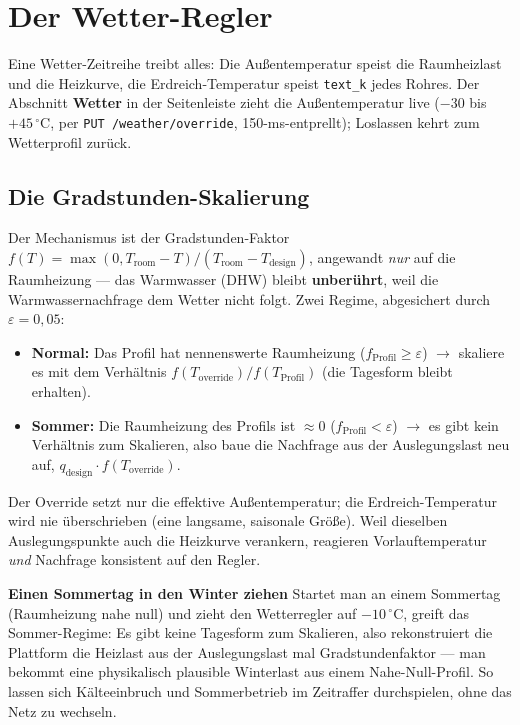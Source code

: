 \documentclass[11pt,a4paper,parskip=half]{scrreprt}
\newcommand{\ui}[1]{\textsf{\bfseries #1}}
\newcommand{\api}[1]{\texttt{#1}}
\newcommand{\gC}{\,\ensuremath{{}^{\circ}\mathrm{C}}}
\newenvironment{beispiel}[1][Beispiel]
  {\par\medskip{\color{bsp}\hrule height 0.8pt}\nopagebreak\smallskip
   \noindent\textbf{\textsf{\textcolor{bsp}{#1}}}\quad\ignorespaces}
  {\par\nopagebreak\smallskip{\color{bsp}\hrule height 0.8pt}\par\medskip}
\begin{document}
\chapter{Der Wetter-Regler}
\label{ch:wetter}

Eine Wetter-Zeitreihe treibt alles: Die Außentemperatur speist die
Raumheizlast und die Heizkurve, die Erdreich-Temperatur speist \texttt{text\_k}
jedes Rohres. Der Abschnitt \ui{Wetter} in der Seitenleiste zieht die
Außentemperatur live ($-30$ bis $+45\gC$, per \api{PUT /weather/override},
150-ms-entprellt); Loslassen kehrt zum Wetterprofil zurück.

\section{Die Gradstunden-Skalierung}

Der Mechanismus ist der Gradstunden-Faktor
$f(T)=\max(0,T_\text{room}-T)/(T_\text{room}-T_\text{design})$, angewandt
\emph{nur} auf die Raumheizung --- das Warmwasser (DHW) bleibt \textbf{unberührt},
weil die Warmwassernachfrage dem Wetter nicht folgt. Zwei Regime, abgesichert
durch $\varepsilon=0{,}05$:

\begin{itemize}[nosep]
  \item \textbf{Normal:} Das Profil hat nennenswerte Raumheizung
    ($f_\text{Profil}\geq\varepsilon$) $\rightarrow$ skaliere es mit dem
    Verhältnis $f(T_\text{override})/f(T_\text{Profil})$ (die Tagesform bleibt
    erhalten).
  \item \textbf{Sommer:} Die Raumheizung des Profils ist $\approx$0
    ($f_\text{Profil}<\varepsilon$) $\rightarrow$ es gibt kein Verhältnis zum
    Skalieren, also baue die Nachfrage aus der Auslegungslast neu auf,
    $q_\text{design}\cdot f(T_\text{override})$.
\end{itemize}

Der Override setzt nur die effektive Außentemperatur; die Erdreich-Temperatur
wird nie überschrieben (eine langsame, saisonale Größe). Weil dieselben
Auslegungspunkte auch die Heizkurve verankern, reagieren Vorlauftemperatur
\emph{und} Nachfrage konsistent auf den Regler.

\begin{beispiel}[Einen Sommertag in den Winter ziehen]
Startet man an einem Sommertag (Raumheizung nahe null) und zieht den
Wetterregler auf $-10\gC$, greift das Sommer-Regime: Es gibt keine Tagesform
zum Skalieren, also rekonstruiert die Plattform die Heizlast aus der
Auslegungslast mal Gradstundenfaktor --- man bekommt eine physikalisch
plausible Winterlast aus einem Nahe-Null-Profil. So lassen sich Kälteeinbruch
und Sommerbetrieb im Zeitraffer durchspielen, ohne das Netz zu wechseln.
\end{beispiel}
\end{document}
